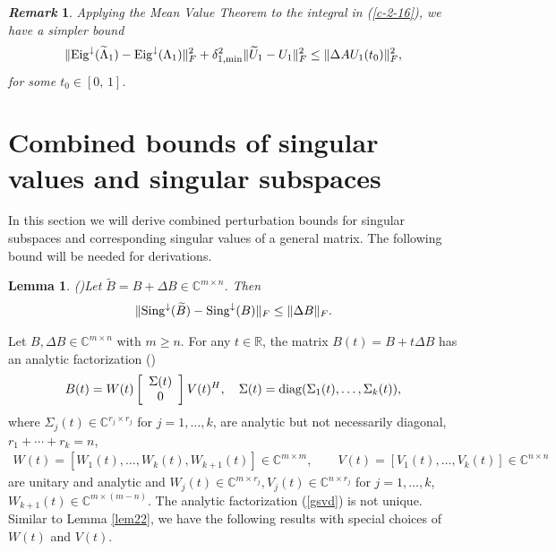 \documentclass[11pt,a4paper]{article}
\numberwithin{equation}{section}
\newcommand {\mat} [1] {\left[\begin{array}{#1}}
\newcommand {\rix}     {\end{array}\right]}
\newtheorem{Lemma}{Lemma}[section]
\newtheorem{Remark}{{\it Remark}}[section]
\newcommand {\wt} {\widetilde}
\newcommand {\diag}  {\mathop{\rm diag}\nolimits}
\begin{document}
\medskip

\begin{Remark} Applying the Mean Value Theorem to the integral in (\ref{c-2-16}), we
have a simpler bound
\[
\|{\rm Eig}^{\downarrow}(\wt\Lambda_1)-{\rm Eig}^{\downarrow}(\Lambda_1)\|_F^2+\delta_{1,\min}^2\|{\wt U_1-U_1}\|_F^2
\leq\|{\Delta A U_1(t_0)}\|_F^2,
\]
for some $t_0\in [0,\,1]$.
\end{Remark}



\section{Combined bounds of singular values and singular subspaces}
\label{sec3} In this section we will derive combined perturbation bounds for singular subspaces and corresponding singular values of a general matrix.
The following bound will be needed for derivations.
\vskip 0.1in
\begin{Lemma} (\cite[Chapter IV, Theorem 4.11]{ss90})\label{lem31}
 Let $\wt B=B+\Delta B\in\mathbb{C}^{m\times n}$. Then
\begin{eqnarray}\label{c-3-0}
\|{\rm Sing^{\downarrow}}(\wt B)-{\rm Sing}^{\downarrow}(B)\|_F\leq \|\Delta B\|_F.
\end{eqnarray}
\end{Lemma}

\medskip
Let $B,\Delta B\in\mathbb{C}^{m\times n}$ with $m\ge n$.
For any $t\in\mathbb{R}$, the matrix $B(t)=B+t\Delta B$ has an analytic factorization  (\cite{bunbmn91,de99})
\begin{eqnarray}
\label{gsvd}
B(t)=W(t)\mat{c}\Sigma(t)\\0\rix V(t)^H,\quad \Sigma(t)=\diag(\Sigma_1(t),\ldots,\Sigma_k(t)),
\end{eqnarray}
where $\Sigma_j(t)\in{\mathbb C}^{r_j\times r_j}$ for $j=1,\ldots,k$,
 are analytic but not necessarily diagonal, $r_1+\cdots+r_k=n$,
\begin{eqnarray}\label{bwv}
 W(t)=\left[ W_1(t),\ldots, W_k(t), W_{k+1}(t)\right]\in {\mathbb C}^{m\times m},\qquad V(t)=\left[V_1(t), \ldots, V_k(t)\right]\in {\mathbb C}^{n\times n}
\end{eqnarray}
are unitary and analytic
and $W_j(t)\in{\mathbb C}^{m\times r_j}, V_j(t)\in{\mathbb C}^{n\times r_j}$ for
$j=1,\ldots,k$, $W_{k+1}(t)\in{\mathbb C}^{m\times (m-n)}$.
The analytic factorization (\ref{gsvd}) is not unique. Similar to Lemma \ref{lem22}, we have the following results with special choices of $W(t)$ and $V(t)$.
\end{document}
